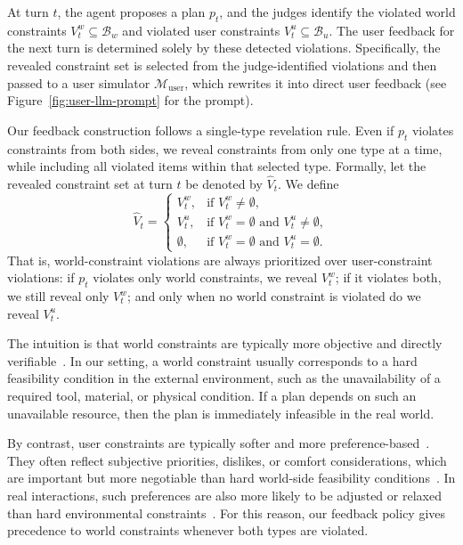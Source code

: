 \documentclass{llmxive}
\begin{document}
At turn $t$, the agent proposes a plan $p_t$, and the judges identify the violated world constraints $V_t^w \subseteq \mathcal{B}_w$ and violated user constraints $V_t^u \subseteq \mathcal{B}_u$. 
The user feedback for the next turn is determined solely by these detected violations. 
Specifically, the revealed constraint set is selected from the judge-identified violations and then passed to a user simulator \(\mathcal{M}_{\mathrm{user}}\), which rewrites it into direct user feedback (see Figure~\ref{fig:user-llm-prompt} for the prompt).

Our feedback construction follows a single-type revelation rule. 
Even if $p_t$ violates constraints from both sides, we reveal constraints from only one type at a time, while including all violated items within that selected type. 
Formally, let the revealed constraint set at turn $t$ be denoted by $\widehat{V}_t$. We define
\[
\widehat{V}_t =
\begin{cases}
V_t^w, & \text{if } V_t^w \neq \emptyset,\\
V_t^u, & \text{if } V_t^w = \emptyset \text{ and } V_t^u \neq \emptyset,\\
\emptyset, & \text{if } V_t^w = \emptyset \text{ and } V_t^u = \emptyset.
\end{cases}
\]
That is, world-constraint violations are always prioritized over user-constraint violations: if $p_t$ violates only world constraints, we reveal $V_t^w$; if it violates both, we still reveal only $V_t^w$; and only when no world constraint is violated do we reveal $V_t^u$.

The intuition is that world constraints are typically more objective and directly verifiable~\citep{DBLP:reference/fai/2}. 
In our setting, a world constraint usually corresponds to a hard feasibility condition in the external environment, such as the unavailability of a required tool, material, or physical condition. 
If a plan depends on such an unavailable resource, then the plan is immediately infeasible in the real world. 

By contrast, user constraints are typically softer and more preference-based~\citep{CAMPIGOTTO2021103454}. 
They often reflect subjective priorities, dislikes, or comfort considerations, which are important but more negotiable than hard world-side feasibility conditions~\citep{ali2010goal,Hoang2012DistinguishingSA,qian2026creativitybench}. 
In real interactions, such preferences are also more likely to be adjusted or relaxed than hard environmental constraints~\citep{hauser2009non,narendhar2016different,ghafour2025smart}. 
For this reason, our feedback policy gives precedence to world constraints whenever both types are violated.
\end{document}
